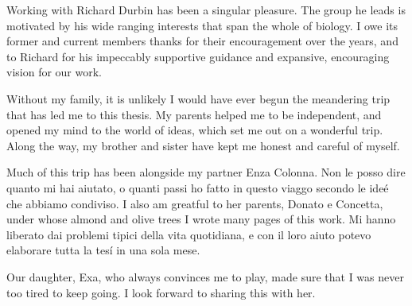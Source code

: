\begin{acknowledgements}
  Working with Richard Durbin has been a singular pleasure.
  The group he leads is motivated by his wide ranging interests that span the whole of biology.
  I owe its former and current members thanks for their encouragement over the years, and to Richard for his impeccably supportive guidance and expansive, encouraging vision for our work.

  Without my family, it is unlikely I would have ever begun the meandering trip that has led me to this thesis. 
  My parents helped me to be independent, and opened my mind to the world of ideas, which set me out on a wonderful trip.
  Along the way, my brother and sister have kept me honest and careful of myself.

  Much of this trip has been alongside my partner Enza Colonna.
  Non le posso dire quanto mi hai aiutato, o quanti passi ho fatto in questo viaggo secondo le ideé che abbiamo condiviso.
  I also am greatful to her parents, Donato e Concetta, under whose almond and olive trees I wrote many pages of this work.
  Mi hanno liberato dai problemi tipici della vita quotidiana, e con il loro aiuto potevo elaborare tutta la tesí in una sola mese.
  
  Our daughter, Exa, who always convinces me to play, made sure that I was never too tired to keep going.
  I look forward to sharing this with her.
  
\end{acknowledgements}
